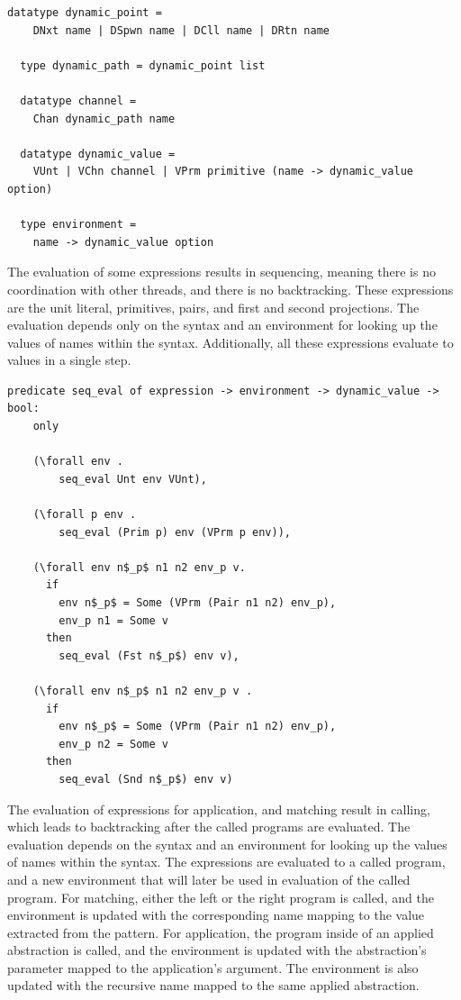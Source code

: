 \documentclass{article}
\begin{document}
\begin{lstlisting}[language=logic]
  datatype dynamic_point =
    DNxt name | DSpwn name | DCll name | DRtn name 

  type dynamic_path = dynamic_point list

  datatype channel =
    Chan dynamic_path name 

  datatype dynamic_value = 
    VUnt | VChn channel | VPrm primitive (name -> dynamic_value option)

  type environment =
    name -> dynamic_value option
  \end{lstlisting}

The evaluation of some expressions results in sequencing, meaning there is no coordination
with other threads, and there is no backtracking. These expressions are the
unit literal, primitives, pairs, and first and second projections. The evaluation depends only
on the syntax and an environment for looking up the values of names within the syntax.
Additionally, all these expressions evaluate to values in a single step.

\begin{lstlisting}[language=logic, mathescape]
  predicate seq_eval of expression -> environment -> dynamic_value -> bool:
    only

    (\forall env . 
        seq_eval Unt env VUnt),
        
    (\forall p env .
        seq_eval (Prim p) env (VPrm p env)),

    (\forall env n$_p$ n1 n2 env_p v. 
      if
        env n$_p$ = Some (VPrm (Pair n1 n2) env_p),
        env_p n1 = Some v
      then
        seq_eval (Fst n$_p$) env v),

    (\forall env n$_p$ n1 n2 env_p v . 
      if
        env n$_p$ = Some (VPrm (Pair n1 n2) env_p), 
        env_p n2 = Some v 
      then
        seq_eval (Snd n$_p$) env v)
  \end{lstlisting}

The evaluation of expressions for application, and matching result in calling, which leads to
backtracking after the called programs are evaluated. The evaluation depends on the syntax
and an environment for looking up the values of names within the syntax.
The expressions are evaluated to a called program, and a new environment that will
later be used in evaluation of the called program. For matching, either the left or the right
program is called, and the environment is updated with the corresponding name mapping to the
value extracted from the pattern. For application, the program inside of an applied abstraction
is called, and the environment is updated with the abstraction's parameter mapped to the
application's argument. The environment is also updated with the recursive name mapped to the
same applied abstraction.
\end{document}
